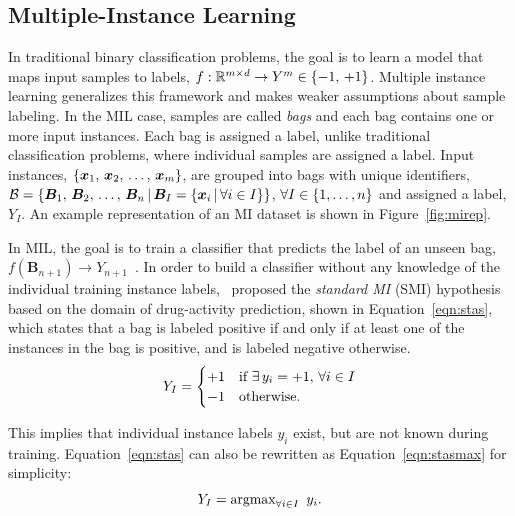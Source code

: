 \subsection{Multiple-Instance Learning}\label{subsec:mil}
In traditional binary classification problems, the goal is to learn a model that maps input samples to labels, $f: {\mathbb R}^{m \times d} \rightarrow Y^m \in {\left\{-1,\,+1\right\}}$. Multiple instance learning generalizes this framework and makes weaker assumptions about sample labeling. In the MIL case, samples are called \textit{bags} and each bag contains one or more input instances. Each bag is assigned a label, unlike traditional classification problems, where individual samples are assigned a label. Input instances, ${\left\{\bm x_1,\, \bm x_2,\, \ldots,\, \bm x_m\right\}}$, are grouped into bags with unique identifiers, $\mathcal{B} = {\left\{\bm B_1,\, \bm B_2,\, \ldots,\, \bm B_n {\,|\,} \bm B_I = {\left\{\bm x_i {\,|\,} \forall i \in I\right\}}\right\}}$, $\forall I \in {\left\{1, \ldots, n\right\}}$ and assigned a label, $Y_I$. An example representation of an MI dataset is shown in Figure~\ref{fig:mirep}. 

In MIL, the goal is to train a classifier that predicts the label of an unseen bag, $f(\bm B_{n+1}) \rightarrow Y_{n+1}$~\citep{Amores2013}. In order to build a classifier without any knowledge of the individual training instance labels,~\cite{Dietterich1997} proposed the \textit{standard MI} (SMI) hypothesis based on the domain of drug-activity prediction, shown in Equation~\ref{eqn:stas}, which states that a bag is labeled positive if and only if at least one of the instances in the bag is positive, and is labeled negative otherwise.
\begin{equation}
\centering \label{eqn:stas}
 Y_I = \begin{cases}
			+1 & \text{if }\exists\, y_i = +1,\, \forall i \in I \\
			-1 & \text{otherwise}.
		  \end{cases}
\end{equation}

This implies that individual instance labels $y_i$ exist, but are not known during training. Equation~\ref{eqn:stas} can also be rewritten as Equation~\ref{eqn:stasmax} for simplicity:
\begin{equation}
\centering \label{eqn:stasmax}
Y_I = \text{argmax}_{\forall i \in I}\,\,\, y_i.
\end{equation}

